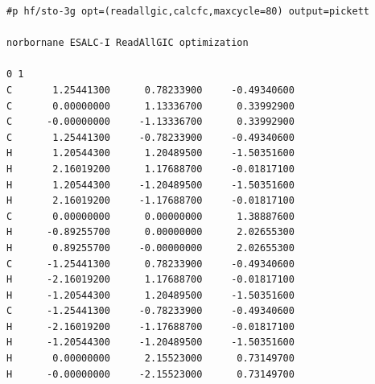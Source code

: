 \documentclass[10pt]{article}
\begin{document}
\begin{lstlisting}[basicstyle=\ttfamily\scriptsize,caption={Complete norbornane Gaussian ReadAllGIC input.}]
#p hf/sto-3g opt=(readallgic,calcfc,maxcycle=80) output=pickett

norbornane ESALC-I ReadAllGIC optimization

0 1
C       1.25441300      0.78233900     -0.49340600
C       0.00000000      1.13336700      0.33992900
C      -0.00000000     -1.13336700      0.33992900
C       1.25441300     -0.78233900     -0.49340600
H       1.20544300      1.20489500     -1.50351600
H       2.16019200      1.17688700     -0.01817100
H       1.20544300     -1.20489500     -1.50351600
H       2.16019200     -1.17688700     -0.01817100
C       0.00000000      0.00000000      1.38887600
H      -0.89255700      0.00000000      2.02655300
H       0.89255700     -0.00000000      2.02655300
C      -1.25441300      0.78233900     -0.49340600
H      -2.16019200      1.17688700     -0.01817100
H      -1.20544300      1.20489500     -1.50351600
C      -1.25441300     -0.78233900     -0.49340600
H      -2.16019200     -1.17688700     -0.01817100
H      -1.20544300     -1.20489500     -1.50351600
H       0.00000000      2.15523000      0.73149700
H      -0.00000000     -2.15523000      0.73149700


\end{lstlisting}
\end{document}

